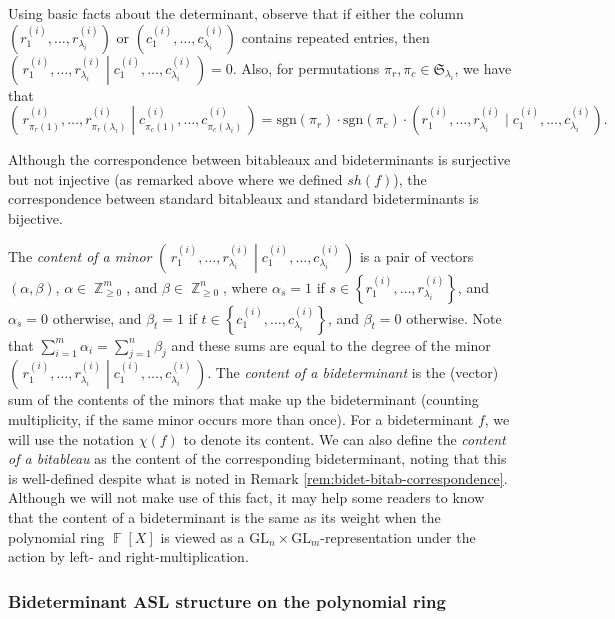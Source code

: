 \documentclass[11pt,reqno]{amsart}
\DeclareMathOperator{\Z}{\mathbb{Z}}
\DeclareMathOperator{\F}{\mathbb{F}}
\newcommand{\sgn}[1]{\mathrm{sgn}\left(#1\right)}
\newcommand{\bidet}[2]{(#1\;|\;#2)}
\newcommand{\bigbidet}[2]{\left(\,\left. #1\;\right|\;#2\,\right)}
\newcommand{\shapetab}[1]{sh(#1)}
\theoremstyle{definition}
\numberwithin{equation}{section}
\begin{document}
Using basic facts about the determinant, observe that if either the column $(r_1^{(i)}, \ldots, r_{\lambda_i}^{(i)})$ or $(c_1^{(i)}, \ldots, c_{\lambda_i}^{(i)})$ contains repeated entries, then $\bigbidet{r_1^{(i)}, \ldots, r_{\lambda_i}^{(i)}}{c_1^{(i)}, \ldots, c_{\lambda_i}^{(i)}} = 0$. Also, for permutations $\pi_r, \pi_c \in \mathfrak{S}_{\lambda_i}$, we have that \[\bigbidet{r_{\pi_r(1)}^{(i)}, \ldots, r_{\pi_r(\lambda_i)}^{(i)}}{c_{\pi_c(1)}^{(i)}, \ldots, c_{\pi_c(\lambda_i)}^{(i)}} = \sgn{\pi_r}\cdot \sgn{\pi_c}\cdot\bidet{r_1^{(i)}, \ldots, r_{\lambda_i}^{(i)}}{c_1^{(i)}, \ldots, c_{\lambda_i}^{(i)}}.\]

\begin{remark}
\label{rem:bidet-bitab-correspondence}
Although the correspondence between bitableaux and bideterminants is surjective but not injective (as remarked above where we defined $\shapetab{f}$), the correspondence between standard bitableaux and standard bideterminants is bijective.
\end{remark}

The \emph{content of a minor} $\bigbidet{r_1^{(i)}, \ldots, r_{\lambda_i}^{(i)}}{c_1^{(i)}, \ldots, c_{\lambda_i}^{(i)}}$ is a pair of vectors $(\alpha, \beta)$, $\alpha \in \Z_{\ge 0}^m$, and $\beta \in \Z_{\ge 0}^n$, where $\alpha_s = 1$ if $s \in \left\{r_1^{(i)}, \ldots, r_{\lambda_i}^{(i)}\right\}$, and $\alpha_s = 0$ otherwise, and $\beta_t = 1$ if $t \in \left\{c_1^{(i)}, \ldots, c_{\lambda_i}^{(i)}\right\}$, and $\beta_t = 0$ otherwise. Note that $\sum_{i=1}^m \alpha_i = \sum_{j=1}^n \beta_j$ and these sums are equal to the degree of the minor $\bigbidet{r_1^{(i)}, \ldots, r_{\lambda_i}^{(i)}}{c_1^{(i)}, \ldots, c_{\lambda_i}^{(i)}}$. The \emph{content of a bideterminant} is the (vector) sum of the contents of the minors that make up the bideterminant (counting multiplicity, if the same minor occurs more than once). For a bideterminant $f$, we will use the notation $\chi(f)$ to denote its content. 
We can also define the \emph{content of a bitableau} as the content of the corresponding bideterminant, noting that this is well-defined despite what is noted in Remark \ref{rem:bidet-bitab-correspondence}. Although we will not make use of this fact, it may help some readers to know that the content of a bideterminant is the same as its weight when the polynomial ring $\F[X]$ is viewed as a $\text{GL}_n \times \text{GL}_m$-representation under the action by left- and right-multiplication.

\subsubsection{Bideterminant ASL structure on the polynomial ring}
\end{document}
